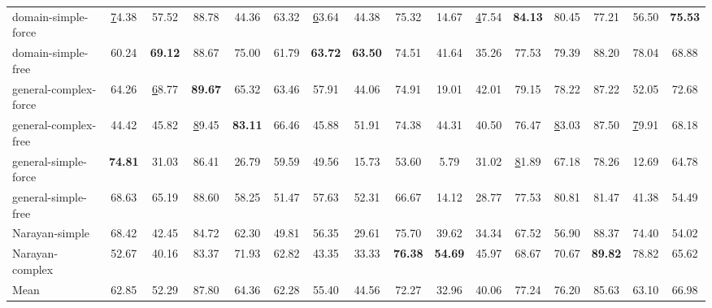 \documentclass[sigconf,nonacm]{acmart}
\begin{document}
\begin{table*}[]
{\begin{tabular}{@{}l|ccccc|ccccc|ccccc@{}}
domain-simple-force   & {\ul 74.38}    & 57.52          & 88.78          & 44.36          & 63.32          & {\ul 63.64}    & 44.38          & 75.32          & 14.67          & {\ul 47.54}    & \textbf{84.13} & 80.45          & 77.21          & 56.50          & \textbf{75.53} \\
domain-simple-free    & 60.24          & \textbf{69.12} & 88.67          & 75.00          & 61.79          & \textbf{63.72} & \textbf{63.50} & 74.51          & 41.64          & 35.26          & 77.53          & 79.39          & 88.20          & 78.04          & 68.88          \\
general-complex-force & 64.26          & {\ul 68.77}    & \textbf{89.67} & 65.32          & 63.46          & 57.91          & 44.06          & 74.91          & 19.01          & 42.01          & 79.15          & 78.22          & 87.22          & 52.05          & 72.68          \\
general-complex-free  & 44.42          & 45.82          & {\ul 89.45}    & \textbf{83.11} & 66.46          & 45.88          & 51.91          & 74.38          & 44.31          & 40.50          & 76.47          & {\ul 83.03}    & 87.50          & {\ul 79.91}    & 68.18          \\
general-simple-force  & \textbf{74.81} & 31.03          & 86.41          & 26.79          & 59.59          & 49.56          & 15.73          & 53.60          & 5.79           & 31.02          & {\ul 81.89}    & 67.18          & 78.26          & 12.69          & 64.78          \\
general-simple-free   & 68.63          & 65.19          & 88.60          & 58.25          & 51.47          & 57.63          & 52.31          & 66.67          & 14.12          & 28.77          & 77.53          & 80.81          & 81.47          & 41.38          & 54.49          \\
Narayan-simple        & 68.42          & 42.45          & 84.72          & 62.30          & 49.81          & 56.35          & 29.61          & 75.70          & 39.62          & 34.34          & 67.52          & 56.90          & 88.37          & 74.40          & 54.02          \\
Narayan-complex       & 52.67          & 40.16          & 83.37          & 71.93          & 62.82          & 43.35          & 33.33          & \textbf{76.38} & \textbf{54.69} & 45.97          & 68.67          & 70.67          & \textbf{89.82} & 78.82          & 65.62          \\ \midrule
Mean                  & 62.85          & 52.29          & 87.80          & 64.36          & 62.28          & 55.40          & 44.56          & 72.27          & 32.96          & 40.06          & 77.24          & 76.20          & 85.63          & 63.10          & 66.98          \\

\end{tabular}}
\end{table*}
\end{document}
